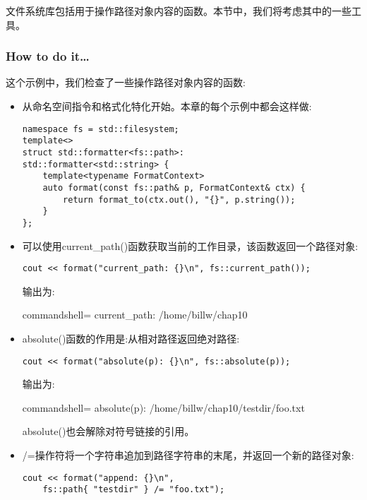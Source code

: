 
文件系统库包括用于操作路径对象内容的函数。本节中，我们将考虑其中的一些工具。

\subsubsection{How to do it…}

这个示例中，我们检查了一些操作路径对象内容的函数:

\begin{itemize}
\item 
从命名空间指令和格式化特化开始。本章的每个示例中都会这样做:

\begin{lstlisting}[style=styleCXX]
namespace fs = std::filesystem;
template<>
struct std::formatter<fs::path>:
std::formatter<std::string> {
	template<typename FormatContext>
	auto format(const fs::path& p, FormatContext& ctx) {
		return format_to(ctx.out(), "{}", p.string());
	}
};
\end{lstlisting}

\item 
可以使用current\_path()函数获取当前的工作目录，该函数返回一个路径对象:

\begin{lstlisting}[style=styleCXX]
cout << format("current_path: {}\n", fs::current_path());
\end{lstlisting}

输出为:

\begin{tcblisting}{commandshell={}}
current_path: /home/billw/chap10
\end{tcblisting}

\item 
absolute()函数的作用是:从相对路径返回绝对路径:

\begin{lstlisting}[style=styleCXX]
cout << format("absolute(p): {}\n", fs::absolute(p));
\end{lstlisting}

输出为:

\begin{tcblisting}{commandshell={}}
absolute(p): /home/billw/chap10/testdir/foo.txt
\end{tcblisting}

absolute()也会解除对符号链接的引用。

\item 
/=操作符将一个字符串追加到路径字符串的末尾，并返回一个新的路径对象:

\begin{lstlisting}[style=styleCXX]
cout << format("append: {}\n",
	fs::path{ "testdir" } /= "foo.txt");
\end{lstlisting}


\end{itemize}
